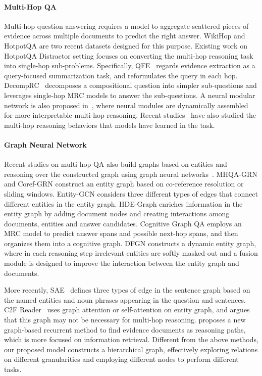 \documentclass[11pt,a4paper]{article}
\begin{document}
\paragraph{Multi-Hop QA}
Multi-hop question answering requires a model to aggregate scattered pieces of evidence across multiple documents to predict the right answer. WikiHop \cite{welbl2018constructing} and HotpotQA \cite{yang2018hotpotqa} are two recent datasets designed for this purpose. 
Existing work on HotpotQA Distractor setting focuses on converting the multi-hop reasoning task into single-hop sub-problems. Specifically, QFE~\cite{nishida2019answering} regards evidence extraction as a query-focused summarization task, and reformulates the query in each hop. DecompRC~\cite{min2019multi} decomposes a compositional question into simpler sub-questions and leverages single-hop MRC models to answer the sub-questions. A neural modular network is also proposed in~\citet{jiang2019self}, where neural modules are dynamically assembled for more interpretable multi-hop reasoning.
Recent studies~\cite{chen2019understanding,min2019compositional,jiang2019avoiding} have also studied the multi-hop reasoning behaviors that models have learned in the task.

\paragraph{Graph Neural Network}
Recent studies on multi-hop QA also build graphs based on entities and reasoning over the constructed graph using graph neural networks~\cite{kipf2016semi,GAT}. MHQA-GRN \cite{song2018exploring} and Coref-GRN \cite{dhingra2018neural} construct an entity graph based on co-reference resolution or sliding windows. Entity-GCN \cite{de2018question} considers three different types of edges that connect different entities in the entity graph.
HDE-Graph \cite{tu2019multi} enriches information in the entity graph by adding document nodes and creating interactions among documents, entities and answer candidates.
Cognitive Graph QA \cite{ding2019cognitive} employs an MRC model to predict answer spans and possible next-hop spans, and then organizes them into a cognitive graph.
DFGN \cite{DFGN} constructs a dynamic entity graph, where in each reasoning step irrelevant entities are softly masked out and a fusion module is designed to improve the interaction between the entity graph and documents.

More recently, SAE~\cite{tu2019select} defines three types of edge in the sentence graph based on the named entities and noun phrases appearing in the question and sentences.
C2F Reader~\cite{c2f} uses graph attention or self-attention on entity graph, and argues that this graph may not be necessary for multi-hop reasoning.
\citet{asai2020learning} proposes a new graph-based recurrent method to find evidence documents as reasoning paths, which is more focused on information retrieval.
Different from the above methods, our proposed model constructs a hierarchical graph, effectively exploring relations on different granularities and employing different nodes to perform different tasks.
\end{document}
